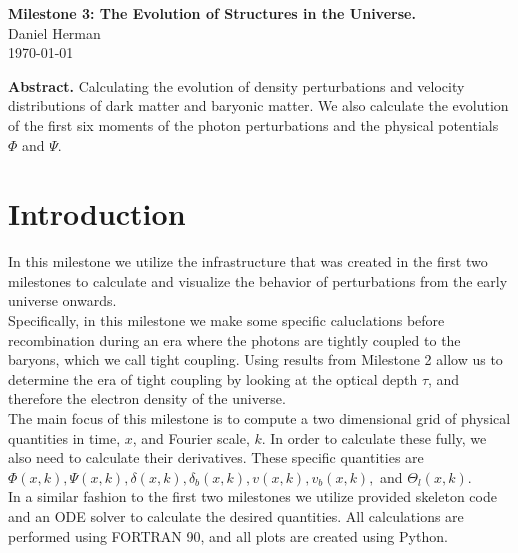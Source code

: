 \documentclass[a4paper]{article}
\begin{document}
\begin{center}
  {\Large \bf Milestone 3: The Evolution of Structures in the Universe.}\\[4ex]
  {\large Daniel Herman}\\[4ex]
  \normalsize
  \today
  \vspace*{8ex}
      
  \begin{minipage}[t]{12cm}
      
  {\bf Abstract.} Calculating the evolution of density perturbations and velocity distributions of dark matter and baryonic matter. We also calculate the evolution of the first six moments of the photon perturbations and the physical potentials $\Phi$ and $\Psi$.
	
  \vspace*{8ex}
  \end{minipage}

\end{center}

\section{Introduction}\label{sec:intro}

In this milestone we utilize the infrastructure that was created in the first two milestones to calculate and visualize the behavior of perturbations from the early universe onwards.\\

Specifically, in this milestone we make some specific caluclations before recombination during an era where the photons are tightly coupled to the baryons, which we call tight coupling. Using results from Milestone 2 allow us to determine the era of tight coupling by looking at the optical depth $\tau$, and therefore the electron density of the universe.\\

The main focus of this milestone is to compute a two dimensional grid of physical quantities in time, $x$, and Fourier scale, $k$. In order to calculate these fully, we also need to calculate their derivatives. These specific quantities are $\Phi(x,k), \Psi(x,k), \delta(x,k), \delta_b(x,k), v(x,k), v_b(x,k),$ and $\Theta_l(x,k)$.\\

In a similar fashion to the first two milestones we utilize provided skeleton code and an ODE solver to calculate the desired quantities. All calculations are performed using FORTRAN 90, and all plots are created using Python.
\end{document}
